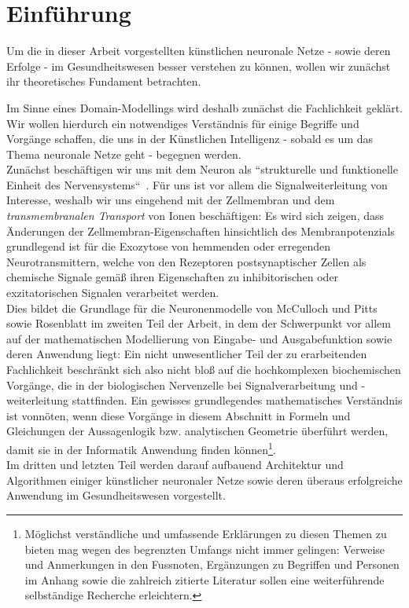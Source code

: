 \chapter{Einführung}

Um die in dieser Arbeit vorgestellten künstlichen neuronale Netze - sowie deren Erfolge - im Gesundheitswesen besser verstehen zu können, wollen wir zunächst  ihr theoretisches Fundament betrachten.

Im Sinne eines Domain-Modellings wird deshalb zunächst die Fachlichkeit geklärt.
Wir wollen hierdurch ein notwendiges Verständnis für einige Begriffe und Vorgänge schaffen, die uns in der Künstlichen Intelligenz - sobald es um das Thema neuronale Netze geht - begegnen werden. \\

Zunächst beschäftigen wir uns mit dem Neuron als ``strukturelle und funktionelle Einheit des Nervensystems``~\cite[42]{SD07}.
Für uns ist vor allem die Signalweiterleitung von Interesse, weshalb wir uns eingehend mit der Zellmembran und dem \textit{transmembranalen Transport} von Ionen beschäftigen: Es wird sich zeigen, dass Änderungen der Zellmembran-Eigenschaften hinsichtlich des Membranpotenzials grundlegend ist für die Exozytose von hemmenden oder erregenden Neurotransmittern, welche von den Rezeptoren postsynaptischer Zellen als chemische Signale gemäß ihren Eigenschaften zu inhibitorischen oder exzitatorischen Signalen verarbeitet werden.\\

Dies bildet die Grundlage für die Neuronenmodelle von McCulloch und Pitts sowie Rosenblatt im zweiten Teil der Arbeit, in dem der Schwerpunkt vor allem auf der mathematischen Modellierung von Eingabe- und Ausgabefunktion sowie deren Anwendung liegt: Ein nicht unwesentlicher Teil der zu erarbeitenden Fachlichkeit beschränkt sich also nicht bloß auf die hochkomplexen biochemischen Vorgänge, die in der biologischen Nervenzelle bei Signalverarbeitung und -weiterleitung stattfinden.
Ein gewisses grundlegendes mathematisches Verständnis ist vonnöten, wenn diese Vorgänge in diesem Abschnitt in Formeln und Gleichungen der Aussagenlogik {bzw.} analytischen Geometrie überführt werden, damit sie in der Informatik Anwendung finden können\footnote{
    Möglichst verständliche und umfassende Erklärungen zu diesen Themen zu bieten mag wegen des begrenzten Umfangs nicht immer gelingen: Verweise und Anmerkungen in den Fussnoten, Ergänzungen zu Begriffen und Personen im Anhang sowie die zahlreich zitierte Literatur sollen eine weiterführende selbständige Recherche erleichtern.
}.\\

Im dritten und letzten Teil werden darauf aufbauend Architektur und Algorithmen einiger künstlicher neuronaler Netze sowie deren überaus erfolgreiche Anwendung im Gesundheitswesen vorgestellt.